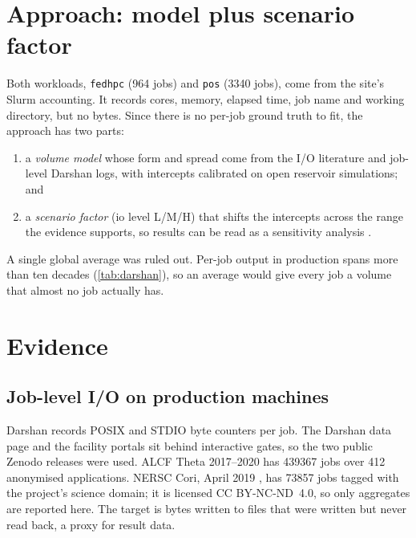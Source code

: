 \documentclass[11pt,a4paper]{article}
\newcommand{\code}[1]{\texttt{#1}}
\begin{document}
\section{Approach: model plus scenario factor}\label{sec:approach}
Both workloads, \code{fedhpc} (964 jobs) and \code{pos} (\num{3340} jobs), come
from the site's Slurm accounting. It records cores, memory, elapsed time, job
name and working directory, but no bytes. Since there is no per-job ground truth
to fit, the approach has two parts:
\begin{enumerate}
  \item a \emph{volume model} whose form and spread come from the I/O literature
        and job-level Darshan logs, with intercepts calibrated on open reservoir
        simulations; and
  \item a \emph{scenario factor} (io level L/M/H) that shifts the intercepts across
        the range the evidence supports, so results can be read as a sensitivity
        analysis \citep{feitelson2015workload}.
\end{enumerate}
A single global average was ruled out. Per-job output in production spans more
than ten decades (\cref{tab:darshan}), so an average would give every job a
volume that almost no job actually has.

\section{Evidence}\label{sec:evidence}
\subsection{Job-level I/O on production machines}
Darshan \citep{carns2011understanding} records POSIX and STDIO byte counters per job.
The Darshan data page and the facility portals sit behind interactive gates, so
the two public Zenodo releases were used. ALCF Theta 2017--2020
\citep{alcf2021theta} has \num{439367} jobs over 412 anonymised applications.
NERSC Cori, April 2019 \citep{bez2022access}, has \num{73857} jobs tagged with
the project's science domain; it is licensed CC BY-NC-ND~4.0, so only aggregates
are reported here. The target is bytes written to files that were written but
never read back, a proxy for result data.
\end{document}
